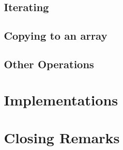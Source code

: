 \documentclass{article}
\begin{document}
	
	
	
	
	
	
	
	
	\subsection{Iterating}
	\label{sec:Iterating}
	
	
	
	
	
	
	
	
	
	\subsection{Copying to an array}
	\label{sec:CopyArray}
	
	

	
	
	
	
	
	
	\subsection{Other Operations}
	
	
	
	\section{Implementations}
	\label{sec:Implementations}
	
	
	
	\section{Closing Remarks}
	
	
	
	\newpage
	
	
\end{document}
